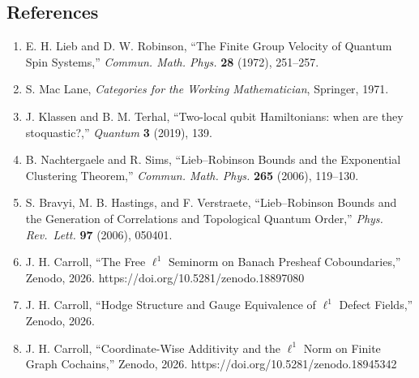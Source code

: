 \documentclass[
]{article}
\providecommand{\tightlist}{%
  \setlength{\itemsep}{0pt}\setlength{\parskip}{0pt}}
\begin{document}
\subsection{References}\label{references}

\begin{enumerate}
\def\labelenumi{\arabic{enumi}.}
\tightlist
\item
  E. H. Lieb and D. W. Robinson, ``The Finite Group Velocity of Quantum
  Spin Systems,'' \emph{Commun. Math. Phys.} \textbf{28} (1972),
  251--257.
\item
  S. Mac Lane, \emph{Categories for the Working Mathematician},
  Springer, 1971.
\item
  J. Klassen and B. M. Terhal, ``Two-local qubit Hamiltonians: when are
  they stoquastic?,'' \emph{Quantum} \textbf{3} (2019), 139.
\item
  B. Nachtergaele and R. Sims, ``Lieb--Robinson Bounds and the
  Exponential Clustering Theorem,'' \emph{Commun. Math. Phys.}
  \textbf{265} (2006), 119--130.
\item
  S. Bravyi, M. B. Hastings, and F. Verstraete, ``Lieb--Robinson Bounds
  and the Generation of Correlations and Topological Quantum Order,''
  \emph{Phys. Rev.~Lett.} \textbf{97} (2006), 050401.
\item
  J. H. Carroll, ``The Free \(\ell^1\) Seminorm on Banach Presheaf
  Coboundaries,'' Zenodo, 2026. https://doi.org/10.5281/zenodo.18897080
\item
  J. H. Carroll, ``Hodge Structure and Gauge Equivalence of \(\ell^1\)
  Defect Fields,'' Zenodo, 2026.
\item
  J. H. Carroll, ``Coordinate-Wise Additivity and the \(\ell^1\) Norm on
  Finite Graph Cochains,'' Zenodo, 2026.
  https://doi.org/10.5281/zenodo.18945342
\end{enumerate}
\end{document}

